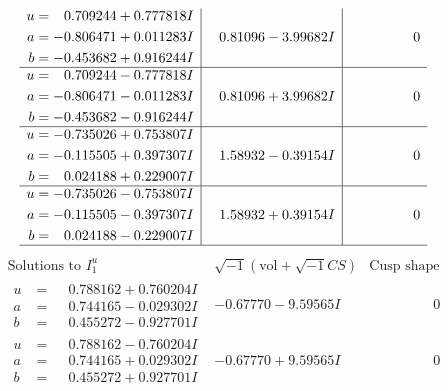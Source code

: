\documentclass[1p]{elsarticle_modified}
\theoremstyle{definition}
\newcommand{\I}{\sqrt{-1}}
\begin{document}
$$\begin{array}{c|c|c}
\begin{aligned}
u &= \phantom{-}0.709244 + 0.777818 I \\
a &= -0.806471 + 0.011283 I \\
b &= -0.453682 + 0.916244 I\end{aligned}
 & \phantom{-}0.81096 - 3.99682 I & \phantom{-0.000000 } 0 \\ \hline\begin{aligned}
u &= \phantom{-}0.709244 - 0.777818 I \\
a &= -0.806471 - 0.011283 I \\
b &= -0.453682 - 0.916244 I\end{aligned}
 & \phantom{-}0.81096 + 3.99682 I & \phantom{-0.000000 } 0 \\ \hline\begin{aligned}
u &= -0.735026 + 0.753807 I \\
a &= -0.115505 + 0.397307 I \\
b &= \phantom{-}0.024188 + 0.229007 I\end{aligned}
 & \phantom{-}1.58932 - 0.39154 I & \phantom{-0.000000 } 0 \\ \hline\begin{aligned}
u &= -0.735026 - 0.753807 I \\
a &= -0.115505 - 0.397307 I \\
b &= \phantom{-}0.024188 - 0.229007 I\end{aligned}
 & \phantom{-}1.58932 + 0.39154 I & \phantom{-0.000000 } 0\\
 \hline 
 \end{array}$$\newpage$$\begin{array}{c|c|c}  
\text{Solutions to }I^u_{1}& \I (\text{vol} + \sqrt{-1}CS) & \text{Cusp shape}\\
 \hline 
\begin{aligned}
u &= \phantom{-}0.788162 + 0.760204 I \\
a &= \phantom{-}0.744165 - 0.029302 I \\
b &= \phantom{-}0.455272 - 0.927701 I\end{aligned}
 & -0.67770 - 9.59565 I & \phantom{-0.000000 } 0 \\ \hline\begin{aligned}
u &= \phantom{-}0.788162 - 0.760204 I \\
a &= \phantom{-}0.744165 + 0.029302 I \\
b &= \phantom{-}0.455272 + 0.927701 I\end{aligned}
 & -0.67770 + 9.59565 I & \phantom{-0.000000 } 0 \\ \hline\begin{aligned}

\end{aligned}
\end{array}$$
\end{document}
